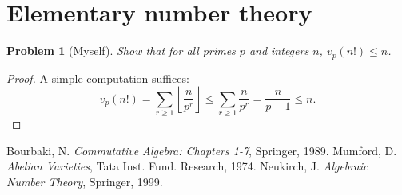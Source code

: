 \documentclass{article}
\newtheorem{problem}{Problem}
\begin{document}
\section{Elementary number theory}





\begin{problem}[Myself]
Show that for all primes $p$ and integers $n$, $v_p(n!)\leqslant n$.
\end{problem}
\begin{proof}
A simple computation suffices:
\[
  v_p(n!) = \sum_{r\geqslant 1} \left\lfloor \frac{n}{p^r}\right\rfloor \leqslant \sum_{r\geqslant 1} \frac{n}{p^r} = \frac{n}{p-1} \leqslant n \text{.}
\]
\end{proof}





\begin{thebibliography}{9}
   Bourbaki, N. \emph{Commutative Algebra: Chapters 1-7}, Springer, 1989. 
   Mumford, D. \emph{Abelian Varieties}, Tata Inst. Fund. Research, 1974. 
   Neukirch, J. \emph{Algebraic Number Theory}, Springer, 1999.
\end{thebibliography}
\end{document}
